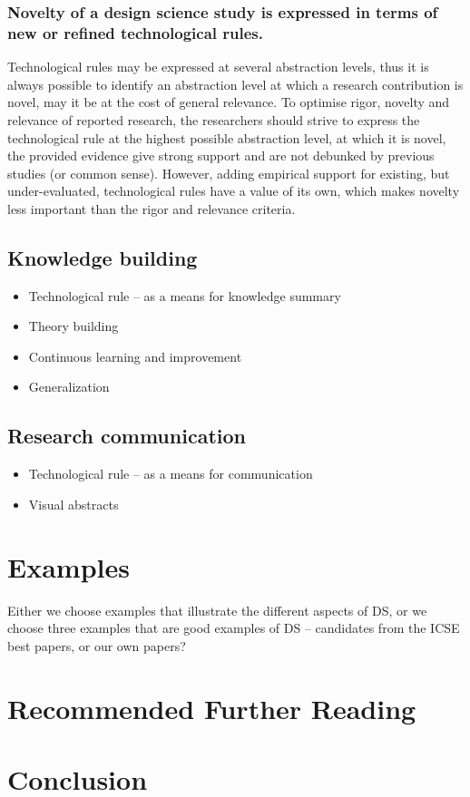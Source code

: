 \documentclass[graybox]{svmult}
\begin{document}
\subsubsection{Novelty of a design science study is expressed in terms of new or refined technological rules.} Technological rules may be expressed at several abstraction levels, thus it is always possible to identify an abstraction level at which a research contribution is novel, may it be at the cost of general relevance. To optimise rigor, novelty and relevance of reported research, the researchers should strive to express the technological rule at the highest possible abstraction level, at which it is novel, the provided evidence give strong support and are not debunked by previous studies (or common sense). However, adding empirical support for existing, but under-evaluated, technological rules have a value of its own, which makes novelty less important than the rigor and relevance criteria.


\subsection{Knowledge building}
\begin{itemize}
\item Technological rule -- as a means for knowledge summary
\item Theory building
\item Continuous learning and improvement
\item Generalization
\end{itemize}

\subsection{Research communication}
\begin{itemize}
\item Technological rule -- as a means for communication
\item Visual abstracts
\end{itemize}

\cite{CarverIEEESW2018}

\section{Examples}
Either we choose examples that illustrate the different aspects of DS, or we choose three examples that are good examples of DS -- candidates from the ICSE best papers, or our own papers?



\section{Recommended Further Reading}

\section{Conclusion}





\end{document}
